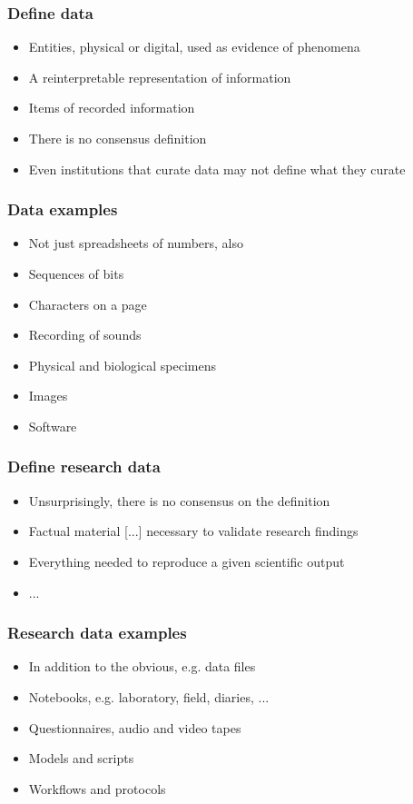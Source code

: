 \documentclass{beamer}
\begin{document}
\begin{frame}
  \frametitle{Define data}
  
  \begin{itemize}
  \item Entities, physical or digital, used as evidence of phenomena \cite{borgman15big}
  \item A reinterpretable representation of information \cite{ccsds12oais}
  \item Items of recorded information
  \item There is no consensus definition
  \item Even institutions that curate data may not define what they curate
  \end{itemize}
\end{frame}

\begin{frame}
  \frametitle{Data examples}
  
  \begin{itemize}
  \item Not just spreadsheets of numbers, also
  \item Sequences of bits
  \item Characters on a page
  \item Recording of sounds
  \item Physical and biological specimens
  \item Images
  \item Software
  \end{itemize}
\end{frame}

\begin{frame}
  \frametitle{Define research data}
  
  \begin{itemize}
  \item Unsurprisingly, there is no consensus on the definition
  \item Factual material [...] necessary to validate research findings \cite{epsrc17researchdata}
  \item Everything needed to reproduce a given scientific output \cite{surkis15researchdata}
  \item ...
  \end{itemize}
\end{frame}

\begin{frame}
  \frametitle{Research data examples}
  
  \begin{itemize}
  \item In addition to the obvious, e.g. data files
  \item Notebooks, e.g. laboratory, field, diaries, ...
  \item Questionnaires, audio and video tapes
  \item Models and scripts
  \item Workflows and protocols
  \end{itemize}
\end{frame}
\end{document}
